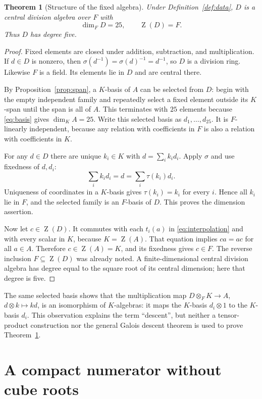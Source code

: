 \documentclass[11pt,letterpaper]{article}
\newtheorem{theorem}{Theorem}[section]
\theoremstyle{definition}
\theoremstyle{remark}
\newcommand{\Cent}{\operatorname{Z}}
\begin{document}
\begin{theorem}[Structure of the fixed algebra]\label{thm:descent}
Under Definition~\ref{def:data}, $D$ is a central division algebra over $F$
with
\[
\dim_F D=25,\qquad \Cent(D)=F.
\]
Thus $D$ has degree five.
\end{theorem}
\begin{proof}
Fixed elements are closed under addition, subtraction, and multiplication.
If $d\in D$ is nonzero, then
$\sigma(d^{-1})=\sigma(d)^{-1}=d^{-1}$, so $D$ is a division ring.
Likewise $F$ is a field. Its elements lie in $D$ and are central there.

By Proposition~\ref{prop:span}, a $K$-basis of $A$ can be selected from
$D$: begin with the empty independent family and repeatedly select a fixed
element outside its $K$-span until the span is all of $A$. This terminates
with $25$ elements because \eqref{eq:basis} gives $\dim_K A=25$.
Write this selected basis as $d_1,\ldots,d_{25}$. It is $F$-linearly
independent, because any relation with coefficients in $F$ is also a
relation with coefficients in $K$.

For any $d\in D$ there are unique $k_i\in K$ with $d=\sum_i k_i d_i$.
Apply $\sigma$ and use fixedness of $d,d_i$:
\[
\sum_i k_i d_i=d=\sum_i\tau(k_i)d_i.
\]
Uniqueness of coordinates in a $K$-basis gives $\tau(k_i)=k_i$ for every
$i$. Hence all $k_i$ lie in $F$, and the selected family is an $F$-basis
of $D$. This proves the dimension assertion.

Now let $c\in\Cent(D)$. It commutes with each $t_i(a)$ in
\eqref{eq:interpolation} and with every scalar in $K$, because
$K=\Cent(A)$. That equation implies $ca=ac$ for all $a\in A$.
Therefore $c\in\Cent(A)=K$, and its fixedness gives $c\in F$.
The reverse inclusion $F\subseteq\Cent(D)$ was already noted.
A finite-dimensional central division algebra has degree equal to the
square root of its central dimension; here that degree is five.
\end{proof}

The same selected basis shows that the multiplication map
$D\otimes_F K\to A$, $d\otimes k\mapsto kd$, is an isomorphism of
$K$-algebras: it maps the $K$-basis $d_i\otimes1$ to the $K$-basis $d_i$.
This observation explains the term ``descent'', but neither a tensor-product
construction nor the general Galois descent theorem is used to prove
Theorem~\ref{thm:descent}.

\section{A compact numerator without cube roots}\label{sec:compact}
\end{document}
